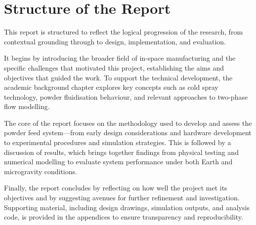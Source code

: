 \section{Structure of the Report}
This report is structured to reflect the logical progression of the research, from contextual grounding through to design, implementation, and evaluation. 

It begins by introducing the broader field of in-space manufacturing and the specific challenges that motivated this project, establishing the aims and objectives that guided the work. To support the technical development, the academic background chapter explores key concepts such as cold spray technology, powder fluidisation behaviour, and relevant approaches to two-phase flow modelling. 

The core of the report focuses on the methodology used to develop and assess the powder feed system—from early design considerations and hardware development to experimental procedures and simulation strategies. This is followed by a discussion of results, which brings together findings from physical testing and numerical modelling to evaluate system performance under both Earth and microgravity conditions. 

Finally, the report concludes by reflecting on how well the project met its objectives and by suggesting avenues for further refinement and investigation. Supporting material, including design drawings, simulation outputs, and analysis code, is provided in the appendices to ensure transparency and reproducibility.